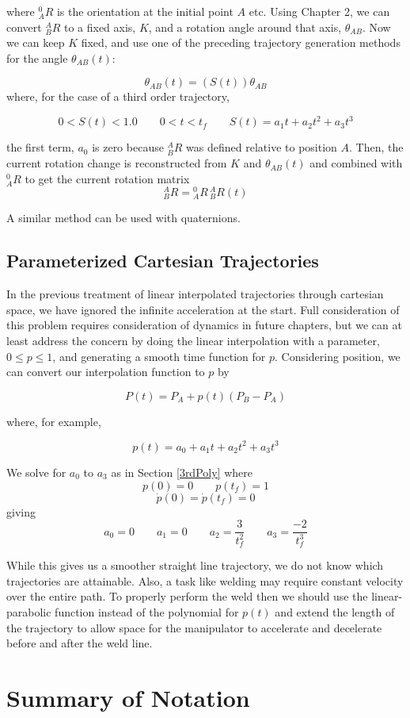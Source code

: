 where ${^0_AR}$ is the orientation at the initial point $A$ etc.   Using Chapter 2, we can convert $^A_BR$ to a fixed axis, $K$, and a rotation angle around that axis, $\theta_{AB}$.  Now we can keep $K$ fixed, and use one of the preceding trajectory generation methods for the angle $\theta_{AB}(t)$:

\[
\theta_{AB}(t) = \left (  S(t)   \right ) {\theta_{AB}}
\]
where, for the case of a third order trajectory,

\[
0 < S(t) < 1.0 \qquad 0 < t < t_{f} \qquad S(t) = a_1t + a_2t^2 + a_3t^3
\]

the first term, $a_0$ is zero because $^A_BR$ was defined relative to position $A$.
Then, the current rotation change is reconstructed from $K$ and $\theta_{AB}(t)$ and combined with $^0_AR$ to get the current rotation matrix
\[
^A_BR = {^0_AR}\, {^A_BR}(t)
\]

A similar method can be used with quaternions.






\subsection{Parameterized Cartesian Trajectories}

In the previous treatment of linear interpolated trajectories through cartesian space, we have ignored the infinite acceleration at the start.  Full consideration of this problem requires consideration of dynamics in future chapters, but we can at least address the concern by doing the linear interpolation with a parameter, $0 \leq p \leq  1$, and generating a smooth time function for $p$.  Considering position, we can convert our interpolation function to $p$ by


\[
P(t) = P_A + p(t)(P_B-P_A)
\]

where, for example,

\[
p(t) = a_0 + a_1t + a_2 t^2 + a_3 t^3
\]

We solve for $a_0$ to $a_3$ as in Section \ref{3rdPoly} where
\[
p(0) = 0   \qquad  p(t_f) = 1
\]
\[
\dot{p}(0) = \dot{p}(t_f) = 0
\]
giving
\[
a_0 = 0 \qquad a_1 = 0 \qquad a_2 = \frac{3}{t_f^2} \qquad a_3 = \frac{-2}{t_f^3}
\]

While this gives us a smoother straight line trajectory, we do not know which trajectories are attainable.   Also, a task like welding may require constant velocity over the entire path.  To properly perform the weld then we should use the linear-parabolic function instead of the polynomial for $p(t)$ and extend the length of the trajectory to  allow space for the manipulator to accelerate and decelerate before and after the weld line.




\section{Summary of Notation}


